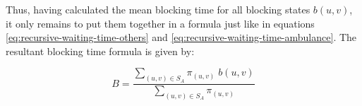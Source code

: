 Thus, having calculated the mean blocking time for all blocking states \(b(u,v)\), 
it only remains to put them together in a formula just like in equations 
\ref{eq:recursive-waiting-time-others} and \ref{eq:recursive-waiting-time-ambulance}.
The resultant blocking time formula is given by:

\begin{equation}\label{eq:algebraic-blocking-time}
    B = \frac{\sum_{(u,v) \in S_A} \pi_{(u,v)} \; b(u,v)}{\sum_{(u,v) \in S_A} 
    \pi_{(u,v)}}
\end{equation}
